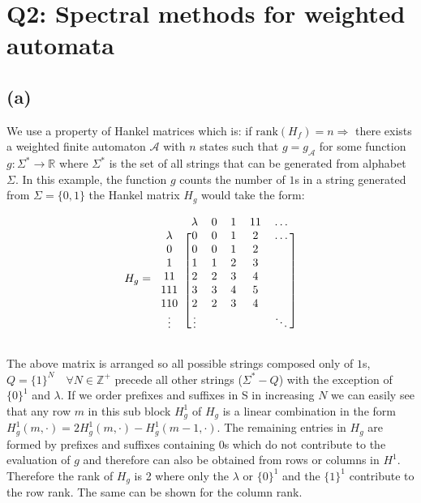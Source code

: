 \documentclass[11pt]{amsart}
\begin{document}
\section{Q2: Spectral methods for weighted automata}
\subsection{(a)}

We use a property of Hankel matrices which is: if $\text{rank}(H_f) = n \Rightarrow$ there exists a weighted finite automaton $\mathcal{A}$  with $n$ states such that $g = g_{\mathcal{A}}$ for some function $g : \Sigma^{*} \rightarrow \mathbb{R}$ where $\Sigma^{*}$ is the set of all strings that can be generated from alphabet $\Sigma$. In this example, the function $g$ counts the number of $1$s in a string generated from $\Sigma = \{0, 1\}$ the Hankel matrix $H_g$ would take the form: 


 
\[
H_g = \begin{blockarray}{cccccc}
\def\ra{\color{red}\ba}
 & \lambda & 0 & 1 & 11 & \hdots \\
\begin{block}{c[ccccc]}
  \lambda & 0 & 0 & 1 & 2 & \hdots \\
  0 & 0 & 0 & 1 & 2 &  \\
  1 & 1 & 1 & 2 & 3 &  \\
  11 & 2 & 2 & 3 & 4 &  \\
  111 & 3 & 3 & 4 & 5 &  \\
  110 & 2 & 2 & 3 & 4 &  \\
  \vdots & \vdots &  &  &  & \ddots \\
\end{block}
\end{blockarray}
\label{mat:h_1}
 \]

The above matrix is arranged so all possible strings composed only of $1$s, $Q = \{1\}^N \quad \forall N \in \mathbb{Z^+}$ precede all other strings ($\Sigma^{*} - Q$) with the exception of $\{0\}^1$ and $\lambda$. If we order prefixes and suffixes in S in increasing $N$ we can easily see that any row $m$ in this sub block $H^{1}_g$ of $H_g$ is a linear combination in the form $H^{1}_g(m, \cdot) = 2H^{1}_g(m, \cdot) - H^{1}_g(m-1, \cdot)$. The remaining entries in $H_g$ are formed by prefixes and suffixes containing $0$s which do not contribute to the evaluation of $g$ and therefore can also be obtained from rows or columns in $H^{1}$. Therefore the rank of $H_g$ is 2 where only the $\lambda$ or $\{0\}^1$ and the $\{1\}^1$ contribute to the row rank. The same can be shown for the column rank.
\end{document}
